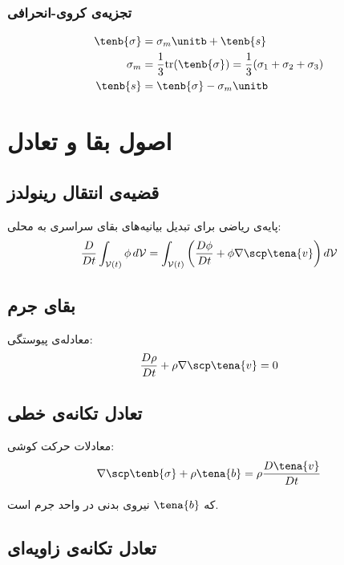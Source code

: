 \subsubsection{تجزیه‌ی کروی-انحرافی}
\begin{align}
	\tenb{\sigma} & = \sigma_m \unitb + \tenb{s}                                                         \\
	\sigma_m      & = \frac{1}{3} \text{tr}(\tenb{\sigma}) = \frac{1}{3}(\sigma_1 + \sigma_2 + \sigma_3) \\
	\tenb{s}      & = \tenb{\sigma} - \sigma_m \unitb
\end{align}

\section{اصول بقا و تعادل}

\subsection{قضیه‌ی انتقال رینولدز}

پایه‌ی ریاضی برای تبدیل بیانیه‌های بقای سراسری به محلی:
\begin{equation}
	\frac{D}{Dt} \int_{\mathcal{V}(t)} \phi \, d\mathcal{V} = \int_{\mathcal{V}(t)} \left( \frac{D\phi}{Dt} + \phi \nabla \scp \tena{v} \right) d\mathcal{V}
\end{equation}

\subsection{بقای جرم}

معادله‌ی پیوستگی:
\begin{equation}
	\frac{D\rho}{Dt} + \rho \nabla \scp \tena{v} = 0
\end{equation}

\subsection{تعادل تکانه‌ی خطی}

معادلات حرکت کوشی:
\begin{equation}
	\nabla \scp \tenb{\sigma} + \rho \tena{b} = \rho \frac{D\tena{v}}{Dt}
\end{equation}

که $\tena{b}$ نیروی بدنی در واحد جرم است.

\subsection{تعادل تکانه‌ی زاویه‌ای}

